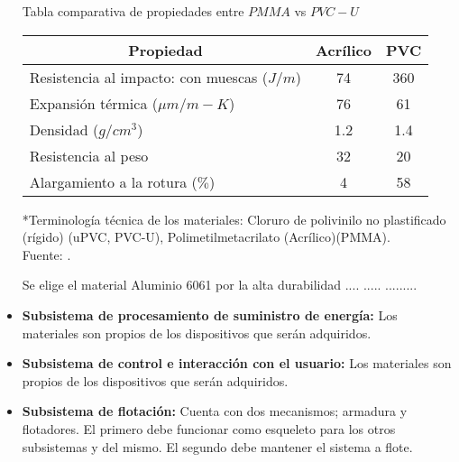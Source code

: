 \begin{itemize}
	\begin{mytable}[H]
		\centering
		\caption{Tabla comparativa de propiedades entre $PMMA$ vs $PVC-U$}
		\label{tab:tabla comparativa de propiedades entre pmma vs pvcu}
		\begin{tabular}{|l|c|c|}
			\hline
			\multicolumn{1}{|c|}{\textbf{Propiedad}} & \multicolumn{1}{c|}{\textbf{Acrílico}} & \textbf{PVC} \\ \hline		
			Resistencia al impacto: con muescas ($J/m$) & 74                & 360          \\ \hline
			Expansión térmica (${\mu}m/m-K$)                 & 76                & 61           \\ \hline
			Densidad ($g/cm^3$)                                   & 1.2               & 1.4          \\ \hline
			Resistencia al peso                                 & 32                & 20           \\ \hline
			Alargamiento a la rotura ($ \% $)                        & 4                 & 58           \\ \hline
		\end{tabular}
		\begin{flushleft}
			*Terminología técnica de los materiales: Cloruro de polivinilo no plastificado (rígido) (uPVC, PVC-U), Polimetilmetacrilato (Acrílico)(PMMA).\\		
			Fuente: \cite{MakeItFrom2020}.
		\end{flushleft}
	\end{mytable}

	Se elige el material Aluminio 6061 por la alta durabilidad .... ..... .........
	
	\item \textbf{Subsistema de procesamiento de suministro de energía:} Los materiales son propios de los dispositivos que serán adquiridos.
	
	\item \textbf{Subsistema de control e interacción con el usuario:} Los materiales son propios de los dispositivos que serán adquiridos.
	
	\item \textbf{Subsistema de flotación:} Cuenta con dos mecanismos; armadura y flotadores. El primero debe funcionar como esqueleto para los otros subsistemas y del mismo. El segundo debe mantener el sistema a flote.
	
\end{itemize}






